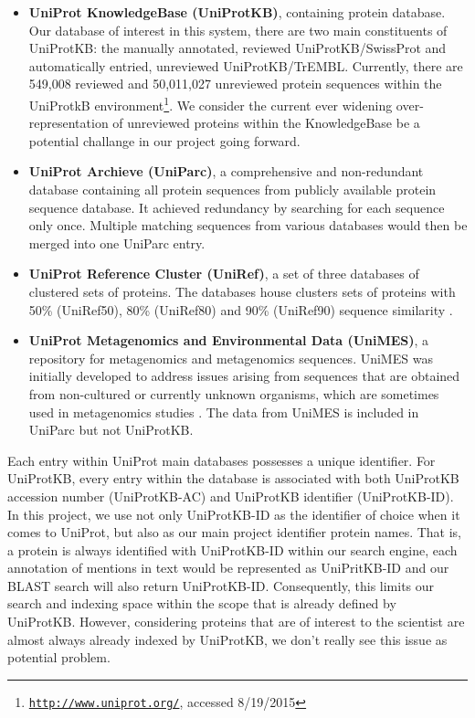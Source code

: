 \begin{itemize}
\item \textbf{UniProt KnowledgeBase (UniProtKB)}, containing protein database. Our database of interest in this system, there are two main constituents of UniProtKB: the manually annotated, reviewed UniProtKB/SwissProt and automatically entried, unreviewed  UniProtKB/TrEMBL. Currently, there are 549,008 reviewed and 50,011,027 unreviewed protein sequences within the UniProtkB environment\footnote{\href{http://www.uniprot.org/}{\texttt{http://www.uniprot.org/}}, accessed 8/19/2015}. We consider the current ever widening over-representation of unreviewed proteins within the KnowledgeBase be a potential challange in our project going forward.

\item \textbf{UniProt Archieve (UniParc)}, a comprehensive and non-redundant database containing all protein sequences from publicly available protein sequence database\citep{leinonen2004uniprot}. It achieved redundancy by searching for each sequence only once. Multiple matching sequences from various databases would then be merged into one UniParc entry.

\item \textbf{UniProt Reference Cluster (UniRef)}, a set of three databases of clustered sets of proteins. The databases house clusters sets of proteins with 50\% (UniRef50), 80\% (UniRef80) and 90\% (UniRef90) sequence similarity \citep{suzek2007uniref}.

\item \textbf{UniProt Metagenomics and Environmental Data (UniMES)}, a repository for metagenomics and metagenomics sequences. UniMES was initially developed to address issues arising from sequences that are obtained from non-cultured or currently unknown organisms, which are sometimes used in metagenomics studies \citep{uniprot2008universal}. The data from UniMES is included in UniParc but not UniProtKB.
\end{itemize}

Each entry within UniProt main databases possesses a unique identifier. For UniProtKB, every entry within the database is associated with both UniProtKB accession number (UniProtKB-AC) and UniProtKB identifier (UniProtKB-ID). In this project, we use not only UniProtKB-ID as the identifier of choice when it comes to UniProt, but also as our main project identifier protein names. That is, a protein is always identified with UniProtKB-ID within our search engine, each annotation of mentions in text would be represented as UniPritKB-ID and our BLAST search will also return UniProtKB-ID. Consequently, this limits our search and indexing space within the scope that is already defined by UniProtKB. However, considering proteins that are of interest to the scientist are almost always already indexed by UniProtKB\citep{leinonen2004uniprot}, we don't really see this issue as potential problem.

